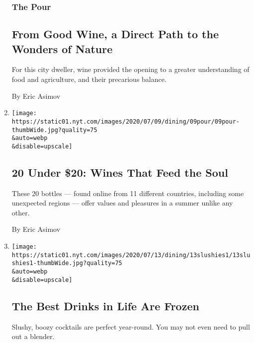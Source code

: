 \begin{enumerate}
  \hypertarget{the-pour-4}{%
  \subsubsection{The Pour}\label{the-pour-4}}

  \hypertarget{from-good-wine-a-direct-path-to-the-wonders-of-nature}{%
  \subsection{From Good Wine, a Direct Path to the Wonders of
  Nature}\label{from-good-wine-a-direct-path-to-the-wonders-of-nature}}

  For this city dweller, wine provided the opening to a greater
  understanding of food and agriculture, and their precarious balance.

  By Eric Asimov
\item
  \href{/2020/07/10/dining/drinks/best-wines-under-20-dollars-pandemic.html}{}

  \texttt{[image: https://static01.nyt.com/images/2020/07/09/dining/09pour/09pour-thumbWide.jpg?quality=75\\\&auto=webp\\\&disable=upscale]}

  \hypertarget{20-under-20-wines-that-feed-the-soul}{%
  \subsection{20 Under \$20: Wines That Feed the
  Soul}\label{20-under-20-wines-that-feed-the-soul}}

  These 20 bottles --- found online from 11 different countries,
  including some unexpected regions --- offer values and pleasures in a
  summer unlike any other.

  By Eric Asimov
\item
  \href{/2020/07/10/dining/drinks/frozen-drink-recipes.html}{}

  \texttt{[image: https://static01.nyt.com/images/2020/07/13/dining/13slushies1/13slushies1-thumbWide.jpg?quality=75\\\&auto=webp\\\&disable=upscale]}

  \hypertarget{the-best-drinks-in-life-are-frozen}{%
  \subsection{The Best Drinks in Life Are
  Frozen}\label{the-best-drinks-in-life-are-frozen}}

  Slushy, boozy cocktails are perfect year-round. You may not even need
  to pull out a blender.


\end{enumerate}
